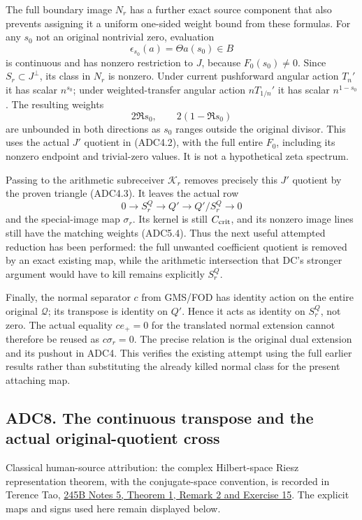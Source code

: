 The full boundary image \(N_r\) has a further exact source component
that also prevents assigning it a uniform one-sided weight bound from
these formulas. For any \(s_0\) not an original nontrivial zero,
evaluation \[
\epsilon_{s_0}(a)=\Theta a(s_0)\in B
\tag{ADC7.3}
\] is continuous and has nonzero restriction to \(J\), because
\(F_0(s_0)\ne0\). Since \(S_r\subset J^\perp\), its class in \(N_r\) is
nonzero. Under current pushforward angular action \(T_n'\) it has scalar
\(n^{s_0}\); under weighted-transfer angular action \(nT_{1/n}'\) it has
scalar \(n^{1-s_0}\). The resulting weights \[
2\Re s_0,\qquad 2(1-\Re s_0)
\tag{ADC7.4}
\] are unbounded in both directions as \(s_0\) ranges outside the
original divisor. This uses the actual \(J'\) quotient in (ADC4.2), with
the full entire \(F_0\), including its nonzero endpoint and trivial-zero
values. It is not a hypothetical zeta spectrum.

Passing to the arithmetic subreceiver \(\mathscr K_r\) removes precisely
this \(J'\) quotient by the proven triangle (ADC4.3). It leaves the
actual row \[
0\to S_r^Q\to Q'\to Q'/S_r^Q\to0
\tag{ADC7.5}
\] and the special-image map \(\sigma_r\). Its kernel is still
\(C_{\rm crit}\), and its nonzero image lines still have the matching
weights (ADC5.4). Thus the next useful attempted reduction has been
performed: the full unwanted coefficient quotient is removed by an exact
existing map, while the arithmetic intersection that DC's stronger
argument would have to kill remains explicitly \(S_r^Q\).

Finally, the normal separator \(c\) from GMS/FOD has identity action on
the entire original \(\mathcal Q\); its transpose is identity on \(Q'\).
Hence it acts as identity on \(S_r^Q\), not zero. The actual equality
\(ce_+=0\) for the translated normal extension cannot therefore be
reused as \(c\sigma_r=0\). The precise relation is the original dual
extension and its pushout in ADC4. This verifies the existing attempt
using the full earlier results rather than substituting the already
killed normal class for the present attaching map.

\subsection{ADC8. The continuous transpose and the actual
original-quotient
cross}\label{adc8.-the-continuous-transpose-and-the-actual-original-quotient-cross}

Classical human-source attribution: the complex Hilbert-space Riesz representation theorem, with the conjugate-space convention, is recorded in Terence Tao, \href{https://terrytao.wordpress.com/2009/01/17/254a-notes-5-hilbert-spaces/}{245B Notes 5, Theorem 1, Remark 2 and Exercise 15}. The explicit maps and signs used here remain displayed below.

